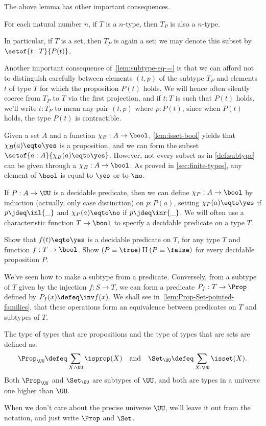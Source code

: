 The above lemma has other important consequences.
\begin{corollary}\label{cor:subtype-same-level}
  For each natural number $n$,
  if $T$ is a $n$-type, then $T_P$ is also a $n$-type.
\end{corollary}
In particular, if $T$ is a set, then $T_P$ is again a set;
we may denote this subset by $\setof{t:T}{P(t)}$.

\begin{remark}\label{rem:subtype-convention}
  Another important consequence of~\cref{lem:subtype-eq-=}
  is that we can afford not to distinguish carefully
  between elements $(t,p)$ of the subtype $T_P$
  and elements $t$ of type $T$ for which the proposition $P(t)$ holds.
  We will hence often silently coerce from $T_P$ to $T$ via the first projection,
  and if $t:T$ is such that $P(t)$ holds, we'll write $t:T_P$
  to mean any pair $(t,p)$ where $p:P(t)$,
  since when $P(t)$ holds, the type $P(t)$ is contractible.
\end{remark}
Given a set $A$ and a function $\chi_B: A\to\bool$,
\cref{lem:isset-bool} yields that $\chi_B(a) \eqto \yes$ is a
proposition, and we can form
the subset $\setof{a:A}{\chi_B(a) \eqto \yes}$. However,
not every subset as in \cref{def:subtype} can be given
through a $\chi_B: A\to\bool$. As proved in \cref{sec:finite-types},
any element of $\bool$ is equal to $\yes$ or to $\no$.

If $P: A\to\UU$ is a decidable predicate, then
we can define $\chi_P: A\to\bool$ by induction (actually,
only case distinction) on $p:P(a)$, setting $\chi_P(a) \eqto \yes$
if $p\jdeq\inl{\_}$ and $\chi_P(a) \eqto \no$ if $p\jdeq\inr{\_}$.
We will often use a characteristic function $T\to\bool$ to
specify a decidable predicate on a type $T$.

\begin{xca}\label{xca:decidability}
Show that $f(t) \eqto \yes$ is a decidable predicate on $T$,
for any type $T$ and function $f:T\to\bool$.
Show $(P\equiv\true)\amalg(P\equiv\false)$ for every decidable
proposition $P$.
\end{xca}
We've seen how to make a subtype from a predicate.
Conversely, from a subtype of $T$ given by the injection
$f : S \to T$,
we can form a predicate $P_f : T \to \Prop$ defined by $P_f(x) \defeq \inv f(x)$.
We shall see in~\cref{lem:Prop-Set-pointed-families},
that these operations form an equivalence
between predicates on $T$ and subtypes of $T$.

\begin{definition}\label{def:Prop-Set}
The type of types that are propositions and the
type of types that are sets are defined as:
\[\Prop_\UU\defeq \sum_{X:\UU}\isprop(X)\quad
\text{and}\quad\Set_\UU\defeq \sum_{X:\UU}\isset(X).\]
Both $\Prop_\UU$ and $\Set_\UU$ are subtypes of $\UU$, and
both are types in a universe one higher than $\UU$.
\end{definition}
When we don't care about the precise universe $\UU$,
we'll leave it out from the notation,
and just write $\Prop$ and $\Set$.

